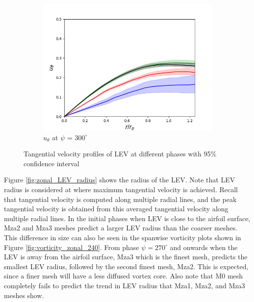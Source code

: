 \begin{figure}[H]
\begin{subfigure}[b]{0.475\textwidth}
	\centering
	\includegraphics[width=1\textwidth]{figures/zonal_adapt_results/LEV/u_theta/phase_300.png}
	\caption{ $u_\theta$ at $\psi$ = $300^\circ$}
	\label{fig:zonal_utheta_300}
	\end{subfigure}
    \label{fig:zonal_utheta_LEV}
   	\caption{Tangential velocity profiles of LEV at different phases with 95\% confidence interval}
\end{figure}


Figure \ref{fig:zonal_LEV_radius} shows the radius of the LEV. Note that LEV radius is considered at where maximum tangential velocity is achieved.
Recall that tangential velocity is computed along multiple radial lines, and the peak tangential velocity is obtained from this averaged tangential velocity along multiple radial lines. 
In the initial phases when LEV is close to the airfoil surface, Mza2 and Mza3 meshes predict a larger LEV radius than the coarser meshes. 
This difference in size can also be seen in the spanwise vorticity plots shown in Figure \ref{fig:vorticity_zonal_240}.
From phase $\psi = 270^\circ$ and onwards when the LEV is away from the airfoil surface, Mza3 which is the finest mesh, predicts the smallest LEV radius, followed by the second finest mesh, Mza2. 
This is expected, since a finer mesh will have a less diffused vortex core. Also note that M0 mesh completely fails to predict the trend in LEV radius that Mza1, Mza2, and Mza3 meshes show.

